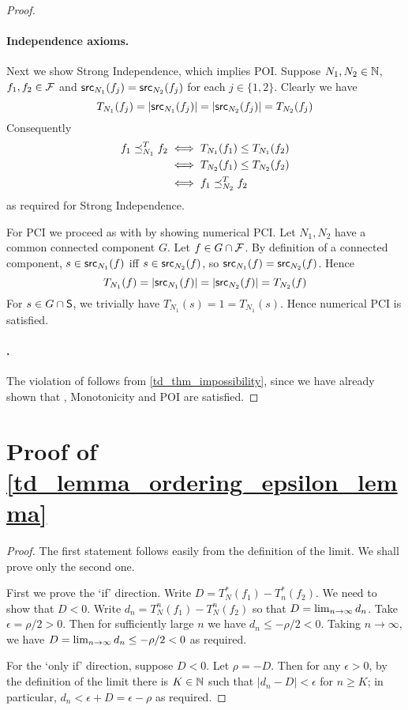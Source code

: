 \begin{proof}
\paragraph{Independence axioms.} Next we show Strong Independence, which
implies POI. Suppose $N_1, N_2 \in \N$, $f_1, f_2 \in \F$ and $\src_{N_1}(f_j)
= \src_{N_2}(f_j)$ for each $j \in \{1, 2\}$. Clearly we have
\[
    T_{N_1}(f_j) = |\src_{N_1}(f_j)| = |\src_{N_2}(f_j)| = T_{N_2}(f_j)
\]
Consequently
\begin{align*}
    f_1 \fle_{N_1}^{T} f_2
    & \iff T_{N_1}(f_1) \le T_{N_1}(f_2) \\
    & \iff T_{N_2}(f_1) \le T_{N_2}(f_2) \\
    & \iff f_1 \fle_{N_2}^{T} f_2
\end{align*}
as required for Strong Independence.

    For PCI we proceed as with \symmetry{} by showing numerical PCI. Let $N_1, N_2$
have a common connected component $G$. Let $f \in G \cap \F$. By definition of
a connected component, $s \in \src_{N_1}(f)$ iff $s \in \src_{N_2}(f)$, so
$\src_{N_1}(f) = \src_{N_2}(f)$.
Hence
\[
    T_{N_1}(f)
    = |\src_{N_1}(f)|
    = |\src_{N_2}(f)|
    = T_{N_2}(f)
\]
For $s \in G \cap \S$, we trivially have $T_{N_1}(s) = 1 = T_{N_1}(s)$. Hence
numerical PCI is satisfied.

\paragraph{\coherence{}.} The violation of \coherence{} follows from
\cref{td_thm_impossibility}, since we have already shown that \symmetry{},
Monotonicity and POI are satisfied.
\end{proof}

\section{Proof of \cref{td_lemma_ordering_epsilon_lemma}}

\begin{proof}
The first statement follows easily from the definition of the limit. We shall
prove only the second one.

First we prove the `if' direction. Write $D = T^*_N(f_1) - T^*_n(f_2)$. We need
to show that $D < 0$. Write $d_n = T_N^n(f_1) - T_N^n(f_2)$ so that $D =
\limn{d_n}$. Take $\epsilon = \rho / 2 > 0$. Then for sufficiently large $n$ we
have $d_n \le -\rho / 2 < 0$. Taking $n \to \infty$, we have $D = \limn{d_n}
\le -\rho / 2 < 0$ as required.

For the `only if' direction, suppose $D < 0$. Let $\rho = -D$. Then for any
$\epsilon > 0$, by the definition of the limit there is $K \in \Nat$ such that
$|d_n - D| < \epsilon$ for $n \ge K$; in particular, $d_n < \epsilon + D =
\epsilon - \rho$ as required.
\end{proof}

